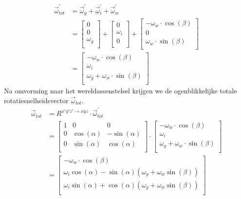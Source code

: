\begin{equation}
\begin{split}
\vec{\omega}_{tot}^{'}&=\vec{\omega}_{g}^{'} + \vec{\omega}_{i}^{'} + \vec{\omega}_{w}^{'}\\
&=\begin{bmatrix}
0						\\
0						\\
\omega_{g}	\\
\end{bmatrix}
+\begin{bmatrix}
0						\\
\omega_{i}	\\
0						\\
\end{bmatrix}
+\begin{bmatrix}
-\omega_{w}\cdot \cos(\beta)	\\
0						\\
\omega_{w}\cdot \sin(\beta)	\\
\end{bmatrix}\\
&=\begin{bmatrix}
-\omega_{w}\cdot \cos(\beta)	\\
\omega_{i}						\\
\omega_{g}+\omega_{w}\cdot \sin(\beta)	\\
\end{bmatrix}
\end{split}
\label{eq:kin1.2}
\end{equation}
Na omvorming naar het wereldassenstelsel krijgen we de ogenblikkelijke totale rotatiesnelheidsvector $\vec{\omega}_{tot}$.
\begin{equation}
\begin{split}
\vec{\omega}_{tot}&=R^{x'y'z' \rightarrow xyz} \cdot \vec{\omega}_{tot}^{'}\\
&=\begin{bmatrix}
1			&			0			&			0		   \\
0			&\cos(\alpha)&-\sin(\alpha)\\
0			&\sin(\alpha)&\cos(\alpha) \\
\end{bmatrix}
\cdot
\begin{bmatrix}
-\omega_{w}\cdot \cos(\beta)	\\
\omega_{i}						\\
\omega_{g}+\omega_{w}\cdot \sin(\beta)	\\
\end{bmatrix}\\
&=
\begin{bmatrix}
-\omega_{w}\cdot \cos(\beta)	\\
\omega_{i}\cos(\alpha)-\sin(\alpha)(\omega_{g}+\omega_{w}\sin(\beta))\\
\omega_{i}\sin(\alpha)+\cos(\alpha)(\omega_{g}+\omega_{w}\sin(\beta))\\
\end{bmatrix}
\end{split}
\label{eq:kin1.3}
\end{equation}
\newpage
